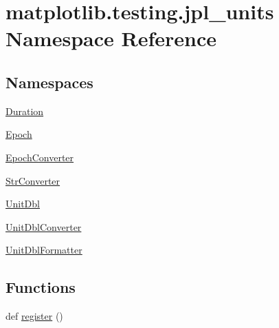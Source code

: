 \hypertarget{namespacematplotlib_1_1testing_1_1jpl__units}{}\section{matplotlib.\+testing.\+jpl\+\_\+units Namespace Reference}
\label{namespacematplotlib_1_1testing_1_1jpl__units}
\subsection*{Namespaces}
\begin{DoxyCompactItemize}
\item 
 \hyperlink{namespacematplotlib_1_1testing_1_1jpl__units_1_1Duration}{Duration}
\item 
 \hyperlink{namespacematplotlib_1_1testing_1_1jpl__units_1_1Epoch}{Epoch}
\item 
 \hyperlink{namespacematplotlib_1_1testing_1_1jpl__units_1_1EpochConverter}{Epoch\+Converter}
\item 
 \hyperlink{namespacematplotlib_1_1testing_1_1jpl__units_1_1StrConverter}{Str\+Converter}
\item 
 \hyperlink{namespacematplotlib_1_1testing_1_1jpl__units_1_1UnitDbl}{Unit\+Dbl}
\item 
 \hyperlink{namespacematplotlib_1_1testing_1_1jpl__units_1_1UnitDblConverter}{Unit\+Dbl\+Converter}
\item 
 \hyperlink{namespacematplotlib_1_1testing_1_1jpl__units_1_1UnitDblFormatter}{Unit\+Dbl\+Formatter}
\end{DoxyCompactItemize}
\subsection*{Functions}
\begin{DoxyCompactItemize}
\item 
def \hyperlink{namespacematplotlib_1_1testing_1_1jpl__units_ae5e86bf22e14304e26b47e66daf1188b}{register} ()
\end{DoxyCompactItemize}
